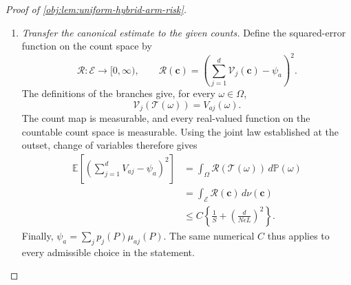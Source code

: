 \begin{proof}[Proof of \cref{obj:lem:uniform-hybrid-arm-risk}]
\begin{enumerate}
\item \textit{Transfer the canonical estimate to the given counts.}
Define the squared-error function on the count space by
\[
\mathcal R:\mathcal E\longrightarrow[0,\infty),
\qquad
\mathcal R(\boldsymbol c)
=
\left(
\sum_{j=1}^d\mathcal V_j(\boldsymbol c)-\psi_a
\right)^2.
\]
The definitions of the branches give, for every \(\omega\in\Omega\),
\[
\mathcal V_j(\mathscr T(\omega))=V_{aj}(\omega).
\]
The count map is measurable, and every real-valued function on the countable count space is measurable. Using the joint law established at the outset, change of variables therefore gives
\[
\begin{aligned}
\mathbb E\left[
\left(\sum_{j=1}^dV_{aj}-\psi_a\right)^2
\right]
&=
\int_\Omega\mathcal R(\mathscr T(\omega))\,d\mathbb P(\omega)\\
&=
\int_{\mathcal E}\mathcal R(\boldsymbol c)\,d\nu(\boldsymbol c)\\
&\le
C\left\{
\frac1S+\left(\frac{d}{N\epsilon L}\right)^2
\right\}.
\end{aligned}
\]
Finally, \(\psi_a=\sum_jp_j(P)\mu_{aj}(P)\). The same numerical \(C\) thus applies to every admissible choice in the statement.
\end{enumerate}
\end{proof}
